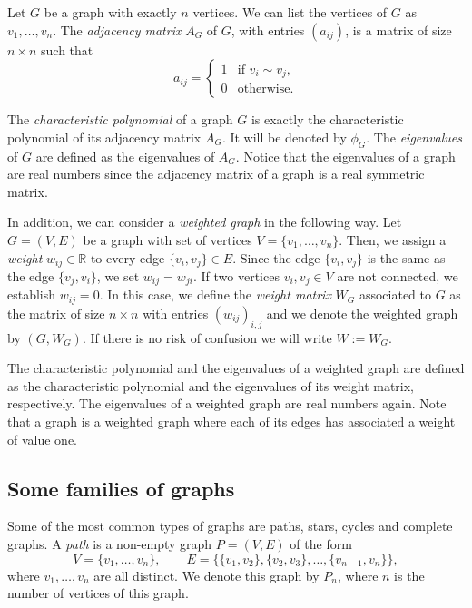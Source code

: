 \documentclass[a4paper]{article}
\newcommand{\R}{\mathbb{R}}
\theoremstyle{plain}
\begin{document}
Let \(G\) be a graph with exactly \(n\) vertices. We can list the vertices of \(G\) as \(v_1, \ldots, v_n\). The \textit{adjacency matrix} \(A_G\) of \(G\), with entries \((a_{ij})\), is a matrix of size \(n \times n\) such that
\[
    a_{ij} = \begin{cases}
        1 & \mbox{if } v_i \sim v_j,\\
        0 & \mbox{otherwise.}
    \end{cases}
\]

The \textit{characteristic polynomial} of a graph \(G\) is exactly the characteristic polynomial of its adjacency matrix \(A_G\). It will be denoted by \(\phi_G\). The \textit{eigenvalues} of \(G\) are defined as the eigenvalues of \(A_G\). Notice that the eigenvalues of a graph are real numbers since the adjacency matrix of a graph is a real symmetric matrix.

In addition, we can consider a \textit{weighted graph} in the following way. Let \(G = (V, E)\) be a graph with set of vertices \(V = \{v_1, \ldots, v_n\}\). Then, we assign a \textit{weight} \(w_{ij} \in \R\) to every edge \(\{v_i,v_j\} \in E\). Since the edge \(\{v_i,v_j\}\) is the same as the edge \(\{v_j,v_i\}\), we set \(w_{ij} = w_{ji}\). If two vertices \(v_i,v_j \in V\) are not connected, we establish \(w_{ij} = 0\). In this case, we define the \textit{weight matrix} $W_G$ associated to $G$ as the matrix of size \(n \times n\) with entries \((w_{ij})_{i,j}\) and we denote the weighted graph by $(G,W_G)$. If there is no risk of confusion we will write $W := W_G$.

The characteristic polynomial and the eigenvalues of a weighted graph are defined as the characteristic polynomial and the eigenvalues of its weight matrix, respectively. The eigenvalues of a weighted graph are real numbers again. Note that a graph is a weighted graph where each of its edges has associated a weight of value one.



\subsection{Some families of graphs}
Some of the most common types of graphs are paths, stars, cycles and complete graphs. A \textit{path} is a non-empty graph \(P = (V,E)\) of the form
\[
    V = \{v_1, \ldots, v_n\}, \qquad E = \{\{v_1,v_2\}, \{v_2, v_3\}, \ldots, \{v_{n-1},v_n\}\},
\]
where \(v_1, \ldots, v_n\) are all distinct. We denote this graph by \(P_n\), where \(n\) is the number of vertices of this graph.
\end{document}
